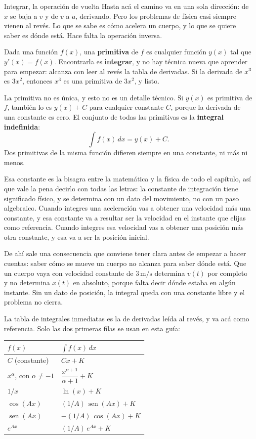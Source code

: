 \documentclass[11pt,openany]{book}
\newcommand{\sen}{\operatorname{sen}}
\begin{document}
\begin{bloque}{Integrar, la operación de vuelta}
Hasta acá el camino va en una sola dirección: de $x$ se baja a $v$ y de $v$ a $a$, derivando. Pero los problemas de física casi siempre vienen al revés. Lo que se sabe es cómo acelera un cuerpo, y lo que se quiere saber es dónde está. Hace falta la operación inversa.

Dada una función $f(x)$, una \textbf{primitiva} de $f$ es cualquier función $y(x)$ tal que $y'(x)=f(x)$. Encontrarla es \textbf{integrar}, y no hay técnica nueva que aprender para empezar: alcanza con leer al revés la tabla de derivadas. Si la derivada de $x^3$ es $3x^2$, entonces $x^3$ es una primitiva de $3x^2$, y listo.

La primitiva no es única, y esto no es un detalle técnico. Si $y(x)$ es primitiva de $f$, también lo es $y(x)+C$ para cualquier constante $C$, porque la derivada de una constante es cero. El conjunto de todas las primitivas es la \textbf{integral indefinida}:
\[
\int f(x)\,dx = y(x) + C.
\]
Dos primitivas de la misma función difieren siempre en una constante, ni más ni menos.

Esa constante es la bisagra entre la matemática y la física de todo el capítulo, así que vale la pena decirlo con todas las letras: la constante de integración tiene significado físico, y se determina con un dato del movimiento, no con un paso algebraico. Cuando integres una aceleración vas a obtener una velocidad más una constante, y esa constante va a resultar ser la velocidad en el instante que elijas como referencia. Cuando integres esa velocidad vas a obtener una posición más otra constante, y esa va a ser la posición inicial.

De ahí sale una consecuencia que conviene tener clara antes de empezar a hacer cuentas: saber cómo se mueve un cuerpo no alcanza para saber dónde está. Que un cuerpo vaya con velocidad constante de $3\,\mathrm{m/s}$ determina $v(t)$ por completo y no determina $x(t)$ en absoluto, porque falta decir dónde estaba en algún instante. Sin un dato de posición, la integral queda con una constante libre y el problema no cierra.

La tabla de integrales inmediatas es la de derivadas leída al revés, y va acá como referencia. Solo las dos primeras filas se usan en esta guía:

\begin{center}
\begin{tabular}{ll}
\toprule
$f(x)$ & $\int f(x)\,dx$ \\
\midrule
$C$ (constante) & $Cx + K$ \\
$x^{\alpha}$, con $\alpha\neq -1$ & $\dfrac{x^{\alpha+1}}{\alpha+1} + K$ \\
$1/x$ & $\ln(x) + K$ \\
$\cos(Ax)$ & $(1/A)\,\sen(Ax) + K$ \\
$\sen(Ax)$ & $-(1/A)\,\cos(Ax) + K$ \\
$e^{Ax}$ & $(1/A)\,e^{Ax} + K$ \\
\bottomrule
\end{tabular}
\end{center}


\end{bloque}
\end{document}
